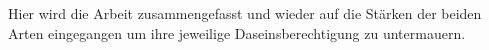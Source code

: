 Hier wird die Arbeit zusammengefasst und wieder auf die Stärken der beiden Arten eingegangen um ihre jeweilige Daseinsberechtigung zu untermauern.